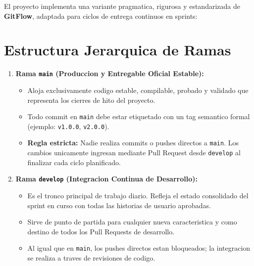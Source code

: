 \documentclass[12pt,a4paper]{report}
\begin{document}
El proyecto implementa una variante pragmatica, rigurosa y estandarizada de \textbf{GitFlow}, adaptada para ciclos de entrega continuos en sprints:

\section{Estructura Jerarquica de Ramas}

\begin{enumerate}
  \item \textbf{Rama \texttt{main} (Produccion y Entregable Oficial Estable):}
  \begin{itemize}
    \item Aloja exclusivamente codigo estable, compilable, probado y validado que representa los cierres de hito del proyecto.
    \item Todo commit en \texttt{main} debe estar etiquetado con un tag semantico formal (ejemplo: \texttt{v1.0.0}, \texttt{v2.0.0}).
    \item \textbf{Regla estricta:} Nadie realiza commits o pushes directos a \texttt{main}. Los cambios unicamente ingresan mediante Pull Request desde \texttt{develop} al finalizar cada ciclo planificado.
  \end{itemize}

  \item \textbf{Rama \texttt{develop} (Integracion Continua de Desarrollo):}
  \begin{itemize}
    \item Es el tronco principal de trabajo diario. Refleja el estado consolidado del sprint en curso con todas las historias de usuario aprobadas.
    \item Sirve de punto de partida para cualquier nueva caracteristica y como destino de todos los Pull Requests de desarrollo.
    \item Al igual que en \texttt{main}, los pushes directos estan bloqueados; la integracion se realiza a traves de revisiones de codigo.
  \end{itemize}


\end{enumerate}
\end{document}
